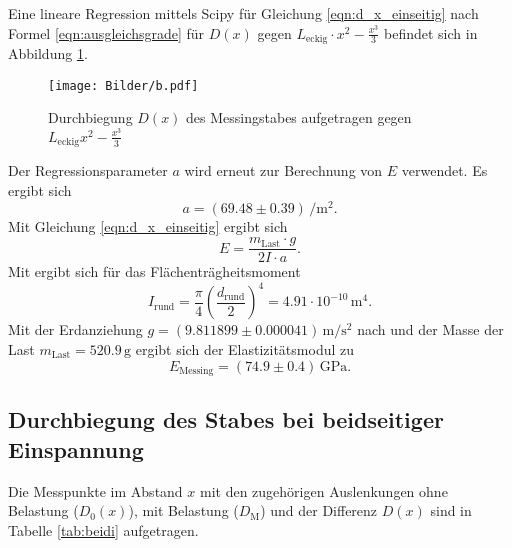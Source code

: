 Eine lineare Regression mittels Scipy \cite{scipy} für Gleichung \eqref{eqn:d_x_einseitig} nach Formel \eqref{eqn:ausgleichsgrade} für $D(x)$ gegen $L_{\mathrm{eckig}}\cdot x^2-\frac{x^3}{3}$
befindet sich in Abbildung \ref{fig:messing_einseitig}.

\begin{figure}
	\centering
	\texttt{[image: Bilder/b.pdf]}
	\caption{Durchbiegung $D(x)$ des Messingstabes aufgetragen gegen $L_{\mathrm{eckig}}x^2-\frac{x^3}{3}$}
	\label{fig:messing_einseitig}
\end{figure}
Der Regressionsparameter $a$ wird erneut zur Berechnung von $E$ verwendet.
Es ergibt sich
\begin{equation*}
	a=(69.48 \pm 0.39) \, \si{\per\square\meter} \text{.}
\end{equation*}
Mit Gleichung \eqref{eqn:d_x_einseitig} ergibt sich
\begin{equation}
	E=\frac{m_{\mathrm{Last}}\cdot g}{2I\cdot a} \text{.}
\end{equation}
Mit \cite{bla} ergibt sich für das Flächenträgheitsmoment
\begin{equation}
	I_{\mathrm{rund}}=\frac{\pi}{4} \left(\frac{d_{\mathrm{rund}}}{2} \right)^4= 4.91 \cdot 10^{-10} \,\si{\meter\tothe{4}}	 \text{.}
\end{equation}
Mit der Erdanziehung $g=(9.811899 \pm 0.000041) \,\si{\meter\per\square\second}$ nach \cite{G} und der Masse der Last $m_{\mathrm{Last}}=520.9\,\si{\gram}$ ergibt sich der Elastizitätsmodul zu
\begin{equation*}
	E_{\mathrm{Messing}}= (74.9 \pm 0.4)\,\si{\giga\pascal} \text{.}
\end{equation*}

\FloatBarrier
\subsection{Durchbiegung des Stabes bei beidseitiger Einspannung}

Die Messpunkte im Abstand $x$ mit den zugehörigen Auslenkungen ohne Belastung ($D_0(x)$), mit
Belastung ($D_{\mathrm{M}}$) und der Differenz $D(x)$ sind in Tabelle \ref{tab:beidi}
aufgetragen.



